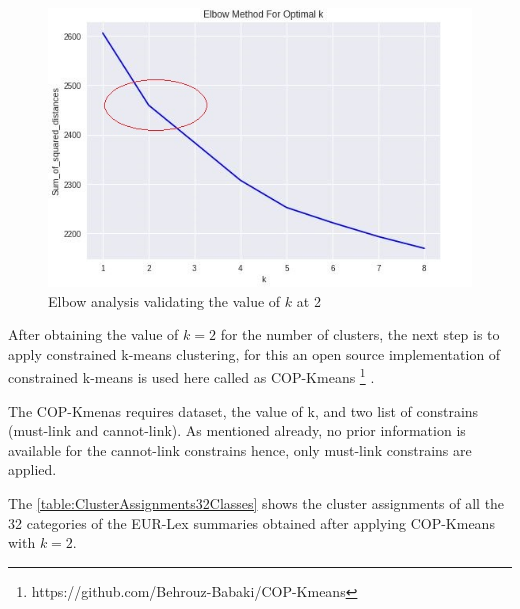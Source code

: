 \begin{figure}[!ht]
    \centering
    \includegraphics{pics/ElbowAT2.jpg}
    \caption{Elbow analysis validating the value of $k$ at 2}
    \label{fig:elbowAT2}
\end{figure}

After obtaining the value of $k = 2$ for the number of clusters, the next step is to apply constrained k-means clustering, for this an open source implementation of constrained k-means is used here called as COP-Kmeans \footnote{https://github.com/Behrouz-Babaki/COP-Kmeans} \cite{behrouz_babaki_2017_831850}. 

The COP-Kmenas requires dataset, the value of k, and two list of constrains (must-link and cannot-link). As mentioned already, no prior information is available for the cannot-link constrains hence, only must-link constrains are applied. 

The \ref{table:ClusterAssignments32Classes} shows the cluster assignments of all the 32 categories of the EUR-Lex summaries obtained after applying COP-Kmeans with $k=2$.
\clearpage

